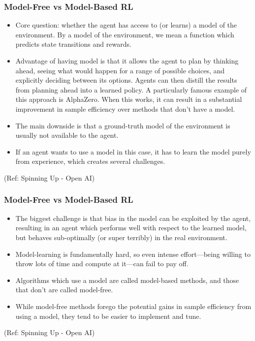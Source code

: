 \begin{frame}[fragile]\frametitle{Model-Free vs Model-Based RL}

\begin{itemize}
\item Core question: whether the agent has access to (or learns) a model of the environment. By a model of the environment, we mean a function which predicts state transitions and rewards.
\item Advantage of having model is that it allows the agent to plan by thinking ahead, seeing what would happen for a range of possible choices, and explicitly deciding between its options. Agents can then distill the results from planning ahead into a learned policy. A particularly famous example of this approach is AlphaZero. When this works, it can result in a substantial improvement in sample efficiency over methods that don't have a model.
\item The main downside is that a ground-truth model of the environment is usually not available to the agent. 
\item If an agent wants to use a model in this case, it has to learn the model purely from experience, which creates several challenges. 

\end{itemize}

{\tiny (Ref: Spinning Up - Open AI)}
\end{frame}

\begin{frame}[fragile]\frametitle{Model-Free vs Model-Based RL}

\begin{itemize}
\item The biggest challenge is that bias in the model can be exploited by the agent, resulting in an agent which performs well with respect to the learned model, but behaves sub-optimally (or super terribly) in the real environment. 
\item Model-learning is fundamentally hard, so even intense effort—being willing to throw lots of time and compute at it—can fail to pay off.
\item Algorithms which use a model are called model-based methods, and those that don't are called model-free. 
\item While model-free methods forego the potential gains in sample efficiency from using a model, they tend to be easier to implement and tune.
\end{itemize}

{\tiny (Ref: Spinning Up - Open AI)}
\end{frame}

